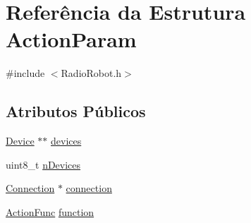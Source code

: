 \hypertarget{structActionParam}{\section{Referência da Estrutura Action\-Param}
\label{structActionParam}
}


{\ttfamily \#include $<$Radio\-Robot.\-h$>$}

\subsection*{Atributos Públicos}
\begin{DoxyCompactItemize}
\item 
\hyperlink{classDevice}{Device} $\ast$$\ast$ \hyperlink{structActionParam_ae2bd1ab1159fb44cf8fd8ac2419ca22b}{devices}
\item 
uint8\-\_\-t \hyperlink{structActionParam_ad3eac6b0a11195bfb750202541506fdd}{n\-Devices}
\item 
\hyperlink{classConnection}{Connection} $\ast$ \hyperlink{structActionParam_aa60c9a775b490aa400ee7f41ba3675b6}{connection}
\item 
\hyperlink{RadioRobot_8h_a3541f6ba20932adb767c7e0d8bdc6940}{Action\-Func} \hyperlink{structActionParam_adc96d4af3e9557b28f39b0da38b502aa}{function}
\end{DoxyCompactItemize}



